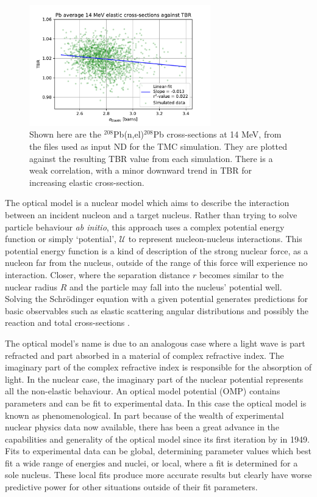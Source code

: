 \begin{figure}[H]
  \centering
	\includegraphics[width=0.7\textwidth]{TBR_Elastic}
	\caption[Correlation between $^{208}$Pb(n,el)$^{208}$Pb cross-sections and TBR.]{Shown here are the $^{208}$Pb(n,el)$^{208}$Pb cross-sections at 14 MeV, from the files used as input ND for the TMC simulation. They are plotted against the resulting TBR value from each simulation. There is a weak correlation, with a minor downward trend in TBR for increasing elastic cross-section.}
	\label{fig:tbr_elastic}
\end{figure}

The optical model is a nuclear model which aims to describe the interaction between an incident nucleon and a target nucleus. Rather than trying to solve particle behaviour \textit{ab initio}, this approach uses a complex potential energy function or simply `potential', $\mathcal{U}$ to represent nucleon-nucleus interactions. This potential energy function is a kind of description of the strong nuclear force, as a nucleon far from the nucleus, outside of the range of this force will experience no interaction. Closer, where the separation distance $r$ becomes similar to the nuclear radius $R$ and the particle may fall into the nucleus' potential well. Solving the Schr\"odinger equation with a given potential generates predictions for basic observables such as elastic scattering angular distributions and possibly the reaction and total cross-sections \cite{Hodgson1971}. 

The optical model's name is due to an analogous case where a light wave is part refracted and part absorbed in a material of complex refractive index. The imaginary part of the complex refractive index is responsible for the absorption of light. In the nuclear case, the imaginary part of the nuclear potential represents all the non-elastic behaviour. An optical model potential (OMP) contains parameters and can be fit to experimental data. In this case the optical model is known as phenomenological. In part because of the wealth of experimental nuclear physics data now available, there has been a great advance in the capabilities and generality of the optical model since its first iteration by \citeauthor{Fernbach1949} in 1949. Fits to experimental data can be global, determining parameter values which best fit a wide range of energies and nuclei, or local, where a fit is determined for a sole nucleus. These local fits produce more accurate results but clearly have worse predictive power for other situations outside of their fit parameters.

